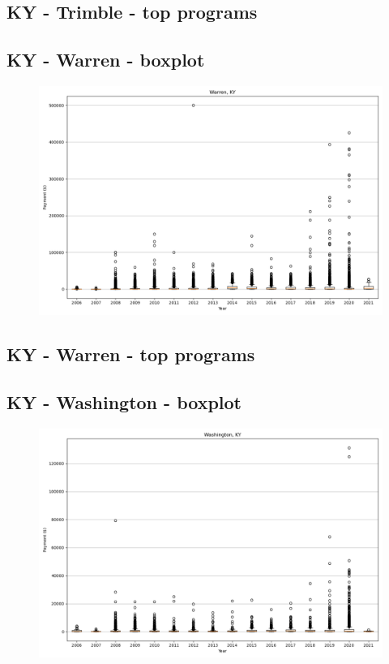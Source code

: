 \subsection*{KY - Trimble - top programs}

\newpage
\subsection*{KY - Warren - boxplot}
\begin{figure}[h]
\centering
\includegraphics[width=7in]{../output/boxplots/counties/Warren-KY_boxplot.png}
\end{figure}


\subsection*{KY - Warren - top programs}

\newpage
\subsection*{KY - Washington - boxplot}
\begin{figure}[h]
\centering
\includegraphics[width=7in]{../output/boxplots/counties/Washington-KY_boxplot.png}
\end{figure}



